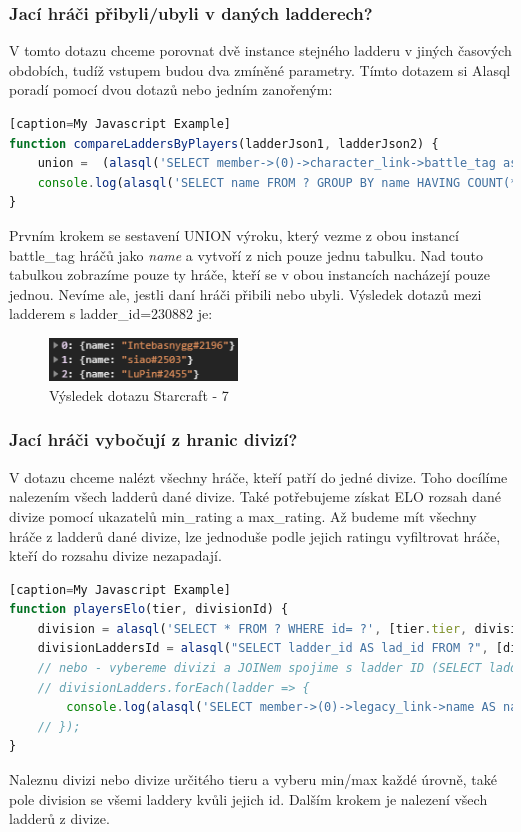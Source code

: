 \documentclass[a4, titlepage]{article}
\begin{document}
\subsubsection{Jací hráči přibyli/ubyli v daných ladderech?}
V tomto dotazu chceme porovnat dvě instance stejného ladderu v jiných časových obdobích, tudíž vstupem budou dva zmíněné parametry. Tímto dotazem si Alasql poradí pomocí dvou dotazů nebo jedním zanořeným: 
\begin{lstlisting}[language=JavaScript][caption=My Javascript Example]
function compareLaddersByPlayers(ladderJson1, ladderJson2) {
    union =  (alasql('SELECT member->(0)->character_link->battle_tag as name FROM ? UNION ALL SELECT member->(0)->character_link->battle_tag as name FROM ?', [ladderJson1.team, ladderJson2.team]));
    console.log(alasql('SELECT name FROM ? GROUP BY name HAVING COUNT(*)=1',[union]));
}
\end{lstlisting}
Prvním krokem se sestavení UNION výroku, který vezme z obou instancí battle\_tag hráčů jako \textit{name} a vytvoří z nich pouze jednu tabulku. Nad touto tabulkou zobrazíme pouze ty hráče, kteří se v obou instancích nacházejí pouze jednou. Nevíme ale, jestli daní hráči přibili nebo ubyli. Výsledek dotazů mezi ladderem s ladder\_id=230882 je:
\begin{figure}[h]
    \centering
    \includegraphics[width=5cm]{S7}
    \caption{Výsledek dotazu Starcraft - 7}
\end{figure} 
\newpage

\subsubsection{Jací hráči vybočují z hranic divizí?}
V dotazu chceme nalézt všechny hráče, kteří patří do jedné divize. Toho docílíme nalezením všech ladderů dané divize. Také potřebujeme získat ELO rozsah dané divize pomocí ukazatelů min\_rating a max\_rating. Až budeme mít všechny hráče z ladderů dané divize, lze jednoduše podle jejich ratingu vyfiltrovat hráče, kteří do rozsahu divize nezapadají. 
\begin{lstlisting}[language=JavaScript][caption=My Javascript Example]
function playersElo(tier, divisionId) {
    division = alasql('SELECT * FROM ? WHERE id= ?', [tier.tier, divisionId]);
    divisionLaddersId = alasql("SELECT ladder_id AS lad_id FROM ?", [division[0].division]);
    // nebo - vybereme divizi a JOINem spojime s ladder ID (SELECT ladder.team FROM ladder INNER JOIN division ON division.ladder=ladder.id)
    // divisionLadders.forEach(ladder => {
    	console.log(alasql('SELECT member->(0)->legacy_link->name AS name, rating FROM ? WHERE rating NOT BETWEEN ? AND ?', [ladder230882_1101.team, division[0].min_rating, division[0].max_rating]));
    // });
}
\end{lstlisting}
Naleznu divizi nebo divize určitého tieru a vyberu min/max každé úrovně, také pole division se všemi laddery kvůli jejich id. Dalším krokem je nalezení všech ladderů z divize. 
\end{document}
